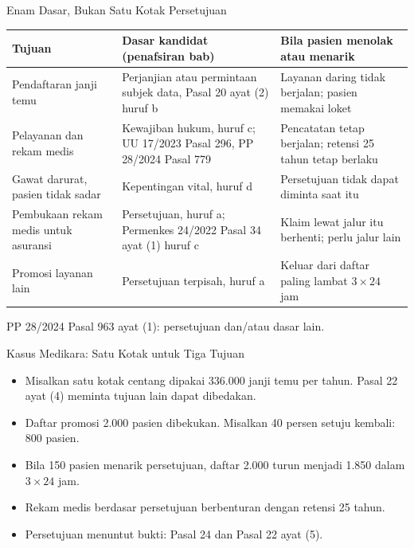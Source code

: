 \documentclass[aspectratio=169, table, 12pt]{beamer}
\begin{document}
\begin{frame}{{\Large Enam Dasar, Bukan Satu Kotak Persetujuan}}
  \vspace{2pt}
  \scriptsize
  \begin{tabularx}{\textwidth}{|>{\raggedright\arraybackslash}p{}|>{\raggedright\arraybackslash}X|>{\raggedright\arraybackslash}X|}
    \hline
    \textbf{Tujuan} & \textbf{Dasar kandidat (penafsiran bab)} & \textbf{Bila pasien menolak atau
    menarik} \\ \hline
    Pendaftaran janji temu & Perjanjian atau permintaan subjek data, Pasal 20 ayat (2) huruf b &
    Layanan daring tidak berjalan; pasien memakai loket \\ \hline
    Pelayanan dan rekam medis & Kewajiban hukum, huruf c; UU 17/2023 Pasal 296, PP 28/2024 Pasal 779
    & Pencatatan tetap berjalan; retensi 25 tahun tetap berlaku \\ \hline
    Gawat darurat, pasien tidak sadar & Kepentingan vital, huruf d & Persetujuan tidak dapat diminta
    saat itu \\ \hline
    Pembukaan rekam medis untuk asuransi & Persetujuan, huruf a; Permenkes 24/2022 Pasal 34 ayat (1)
    huruf c & Klaim lewat jalur itu berhenti; perlu jalur lain \\ \hline
    Promosi layanan lain & Persetujuan terpisah, huruf a & Keluar dari daftar paling lambat
    $3 \times 24$ jam \\ \hline
  \end{tabularx}

  \vspace{6pt}
  \small PP 28/2024 Pasal 963 ayat (1): persetujuan dan/atau dasar lain.
\end{frame}

\begin{frame}{{\Large Kasus Medikara: Satu Kotak untuk Tiga Tujuan}}
  \vspace{6pt}
  \small
  \begin{itemize}
    \item Misalkan satu kotak centang dipakai 336.000 janji temu per tahun. Pasal 22 ayat (4)
          meminta tujuan lain dapat dibedakan.
    \item Daftar promosi 2.000 pasien dibekukan. Misalkan 40 persen setuju kembali: 800 pasien.
    \item Bila 150 pasien menarik persetujuan, daftar 2.000 turun menjadi 1.850 dalam $3 \times 24$
          jam.
    \item Rekam medis berdasar persetujuan berbenturan dengan retensi 25 tahun.
    \item Persetujuan menuntut bukti: Pasal 24 dan Pasal 22 ayat (5).
  \end{itemize}
\end{frame}
\end{document}
